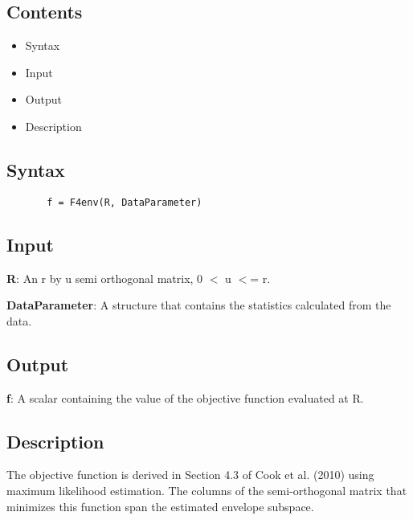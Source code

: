 \documentclass[a4paper,11pt,openany]{memoir}
\begin{document}
\subsection*{Contents}

\begin{itemize}
\setlength{\itemsep}{-1ex}
   \item Syntax
   \item Input
   \item Output
   \item Description
\end{itemize}


\subsection*{Syntax}


\begin{verbatim}       f = F4env(R, DataParameter)\end{verbatim}
    

\subsection*{Input}

\begin{par}
\textbf{R}: An r by u semi orthogonal matrix, 0 \ensuremath{<} u \ensuremath{<}= r.
\end{par} \vspace{1em}
\begin{par}
\textbf{DataParameter}: A structure that contains the statistics calculated from the data.
\end{par} \vspace{1em}


\subsection*{Output}

\begin{par}
\textbf{f}: A scalar containing the value of the objective function evaluated at R.
\end{par} \vspace{1em}


\subsection*{Description}

\begin{par}
The objective function is derived in Section 4.3 of Cook et al. (2010)  using maximum likelihood estimation. The columns of the semi-orthogonal matrix that minimizes this function span the estimated envelope subspace.
\end{par} \vspace{1em}
\end{document}
